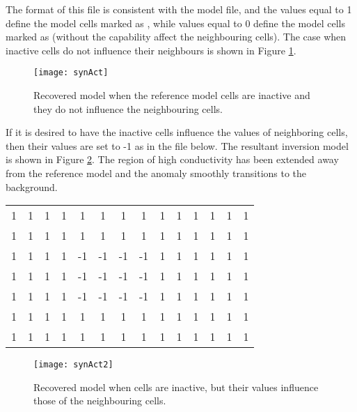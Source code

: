 %
The format of this file is consistent with the model file, and the values equal to 1 define the model cells marked as , while values equal to 0 define the model cells marked as  (without the capability affect the neighbouring cells). The case when inactive cells do not influence their neighbours is shown in Figure \ref{fig:synAct}.
%
\begin{figure}
\centering
\texttt{[image: synAct]}
\caption{Recovered model when the reference model cells are inactive and they do not influence the neighbouring cells.}
\label{fig:synAct}
\end{figure}

If it is desired to have the inactive cells influence the values of neighboring cells, then their values are set to -1 as in the file below. The resultant inversion model is shown in Figure \ref{fig:synAct2}. The region of high conductivity has been extended away from the reference model and the anomaly smoothly transitions to the background.
%
\begin{fileExample}
\begin{tabular}{|cccccccccccccc|}
\hline
1 & 1 & 1 & 1 & 1 & 1 & 1 & 1 & 1 & 1 & 1 & 1 & 1 & 1 \\
1 & 1 & 1 & 1 & 1 & 1 & 1 & 1 & 1 & 1 & 1 & 1 & 1 & 1 \\
1 & 1 & 1 & 1 & -1 & -1 & -1 & -1 & 1 & 1 & 1 & 1 & 1 & 1 \\
1 & 1 & 1 & 1 & -1 & -1 & -1 & -1 & 1 & 1 & 1 & 1 & 1 & 1 \\
1 & 1 & 1 & 1 & -1 & -1 & -1 & -1 & 1 & 1 & 1 & 1 & 1 & 1 \\
1 & 1 & 1 & 1 & 1 & 1 & 1 & 1 & 1 & 1 & 1 & 1 & 1 & 1 \\
1 & 1 & 1 & 1 & 1 & 1 & 1 & 1 & 1 & 1 & 1 & 1 & 1 & 1 \\
\hline
\end{tabular}
\end{fileExample}
%
\begin{figure}
\centering
\texttt{[image: synAct2]}
\caption{Recovered model when cells are inactive, but their values influence those of the neighbouring cells.}
\label{fig:synAct2}
\end{figure}

